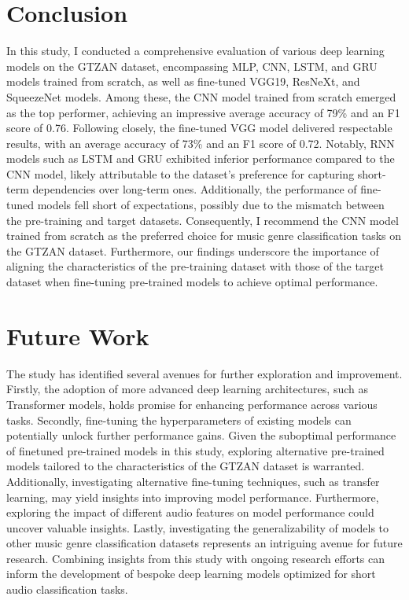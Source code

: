 \documentclass{article}
\begin{document}
\section{Conclusion}

In this study, I conducted a comprehensive evaluation of various deep learning models on the GTZAN dataset, encompassing MLP, CNN, LSTM, and GRU models trained from scratch, as well as fine-tuned VGG19, ResNeXt, and SqueezeNet models. Among these, the CNN model trained from scratch emerged as the top performer, achieving an impressive average accuracy of 79\% and an F1 score of 0.76. 
Following closely, the fine-tuned VGG model delivered respectable results, with an average accuracy of 73\% and an F1 score of 0.72. 
Notably, RNN models such as LSTM and GRU exhibited inferior performance compared to the CNN model, likely attributable to the dataset's preference for capturing short-term dependencies over long-term ones. Additionally, the performance of fine-tuned models fell short of expectations, possibly due to the mismatch between the pre-training and target datasets. 
Consequently, I recommend the CNN model trained from scratch as the preferred choice for music genre classification tasks on the GTZAN dataset. Furthermore, our findings underscore the importance of aligning the characteristics of the pre-training dataset with those of the target dataset when fine-tuning pre-trained models to achieve optimal performance.

\section{Future Work}
The study has identified several avenues for further exploration and improvement. 
Firstly, the adoption of more advanced deep learning architectures, such as Transformer models, holds promise for enhancing performance across various tasks. 
Secondly, fine-tuning the hyperparameters of existing models can potentially unlock further performance gains. Given the suboptimal performance of finetuned pre-trained models in this study, exploring alternative pre-trained models tailored to the characteristics of the GTZAN dataset is warranted. 
Additionally, investigating alternative fine-tuning techniques, such as transfer learning, may yield insights into improving model performance. Furthermore, exploring the impact of different audio features on model performance could uncover valuable insights. 
Lastly, investigating the generalizability of models to other music genre classification datasets represents an intriguing avenue for future research. 
Combining insights from this study with ongoing research efforts can inform the development of bespoke deep learning models optimized for short audio classification tasks.
\end{document}

